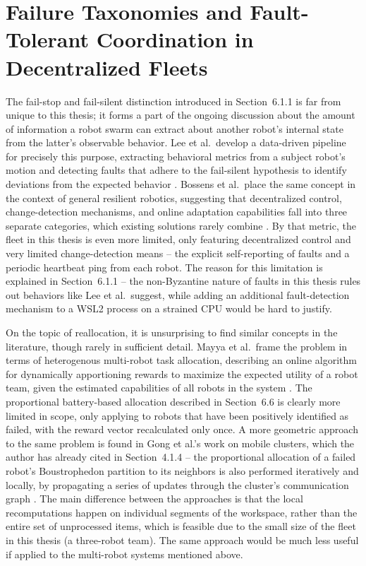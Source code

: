 \section{Failure Taxonomies and Fault-Tolerant Coordination in Decentralized Fleets}

The fail-stop and fail-silent distinction introduced in Section~6.1.1 is far from unique to this thesis; it forms a part of the ongoing discussion about the amount of information a robot swarm can extract about another robot's internal state from the latter's observable behavior. Lee et al.\ develop a data-driven pipeline for precisely this purpose, extracting behavioral metrics from a subject robot's motion and detecting faults that adhere to the fail-silent hypothesis to identify deviations from the expected behavior \cite{lee2022datadriven}. Bossens et al.\ place the same concept in the context of general resilient robotics, suggesting that decentralized control, change-detection mechanisms, and online adaptation capabilities fall into three separate categories, which existing solutions rarely combine \cite{bossens2022resilient}. By that metric, the fleet in this thesis is even more limited, only featuring decentralized control and very limited change-detection means – the explicit self-reporting of faults and a periodic heartbeat ping from each robot. The reason for this limitation is explained in Section~6.1.1 – the non-Byzantine nature of faults in this thesis rules out behaviors like Lee et al.\ suggest, while adding an additional fault-detection mechanism to a WSL2 process on a strained CPU would be hard to justify.

On the topic of reallocation, it is unsurprising to find similar concepts in the literature, though rarely in sufficient detail. Mayya et al.\ frame the problem in terms of heterogenous multi-robot task allocation, describing an online algorithm for dynamically apportioning rewards to maximize the expected utility of a robot team, given the estimated capabilities of all robots in the system \cite{mayya2021resilient}. The proportional battery-based allocation described in Section~6.6 is clearly more limited in scope, only applying to robots that have been positively identified as failed, with the reward vector recalculated only once. A more geometric approach to the same problem is found in Gong et al.'s work on mobile clusters, which the author has already cited in Section~4.1.4 – the proportional allocation of a failed robot's Boustrophedon partition to its neighbors is also performed iteratively and locally, by propagating a series of updates through the cluster's communication graph \cite{gong2024resilient}. The main difference between the approaches is that the local recomputations happen on individual segments of the workspace, rather than the entire set of unprocessed items, which is feasible due to the small size of the fleet in this thesis (a three-robot team). The same approach would be much less useful if applied to the multi-robot systems mentioned above.

